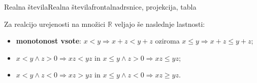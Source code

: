 \begin{priprava}{1}{}{Realna števila}{Realna števila}{frontalna}{drsnice, projekcija, tabla}
                ~

            
                Za realcijo urejenosti na množici $\mathbb{R}$ veljajo še naslednje lastnosti:

                \begin{itemize}
                    \item \textbf{monotonost vsote}: $x<y \Rightarrow x+z<y+z$ oziroma $x\leq y \Rightarrow x+z\leq y+z$;
                    \item $x<y \land z>0 \Rightarrow xz<yz$ in $x\leq y \land z>0 \Rightarrow x z\leq y z$;
                    \item $x<y \land z<0 \Rightarrow xz>yz$ in $x\leq y \land z<0 \Rightarrow x z\geq y z$.
                \end{itemize}

            

        

    
\end{priprava}